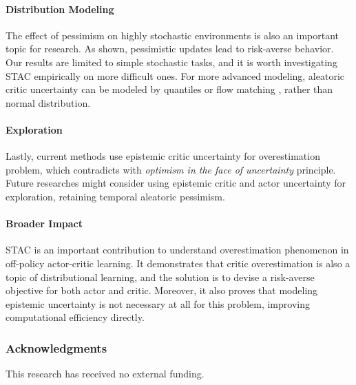\documentclass[10pt]{article} %
\begin{document}
\paragraph{Distribution Modeling} The effect of pessimism on highly stochastic environments is also an important topic for research. As shown, pessimistic updates lead to risk-averse behavior. Our results are limited to simple stochastic tasks, and it is worth investigating STAC empirically on more difficult ones. For more advanced modeling, aleatoric critic uncertainty can be modeled by quantiles \citep{dabney2018distributional, ma2025dsac} or flow matching \citep{chen2025unleashing, dong2025value}, rather than normal distribution. 

\paragraph{Exploration} Lastly, current methods use epistemic critic uncertainty for overestimation problem, which contradicts with \textit{optimism in the face of uncertainty} principle. Future researches might consider using epistemic critic and actor uncertainty for exploration, retaining temporal aleatoric pessimism. 

\paragraph{Broader Impact} STAC is an important contribution to understand overestimation phenomenon in off-policy actor-critic learning. It demonstrates that critic overestimation is also a topic of distributional learning, and the solution is to devise a risk-averse objective for both actor and critic. Moreover, it also proves that modeling epistemic uncertainty is not necessary at all for this problem, improving computational efficiency directly. 

\subsubsection*{Acknowledgments}
This research has received no external funding. 





\newpage 
\end{document}
